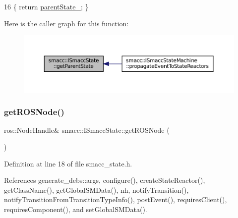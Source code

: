 \begin{DoxyCode}
16 \{ \textcolor{keywordflow}{return} \hyperlink{classsmacc_1_1ISmaccState_ad61db41d8d06a836e7d1dac7767f5695}{parentState\_}; \}
\end{DoxyCode}
Here is the caller graph for this function\+:
\nopagebreak
\begin{figure}[H]
\begin{center}
\leavevmode
\includegraphics[width=350pt]{classsmacc_1_1ISmaccState_a3484b4a32ef47a8650f08df67de4fae5_icgraph}
\end{center}
\end{figure}
\mbox{\label{classsmacc_1_1ISmaccState_a5d3f13b9d7ae7fdcf9da21c4ed935706}} 
\subsubsection{\texorpdfstring{get\+R\+O\+S\+Node()}{getROSNode()}}
{\footnotesize\ttfamily ros\+::\+Node\+Handle\& smacc\+::\+I\+Smacc\+State\+::get\+R\+O\+S\+Node (\begin{DoxyParamCaption}{ }\end{DoxyParamCaption})\hspace{0.3cm}{\ttfamily [inline]}}



Definition at line 18 of file smacc\+\_\+state.\+h.



References generate\+\_\+debs\+::args, configure(), create\+State\+Reactor(), get\+Class\+Name(), get\+Global\+S\+M\+Data(), nh, notify\+Transition(), notify\+Transition\+From\+Transition\+Type\+Info(), post\+Event(), requires\+Client(), requires\+Component(), and set\+Global\+S\+M\+Data().


